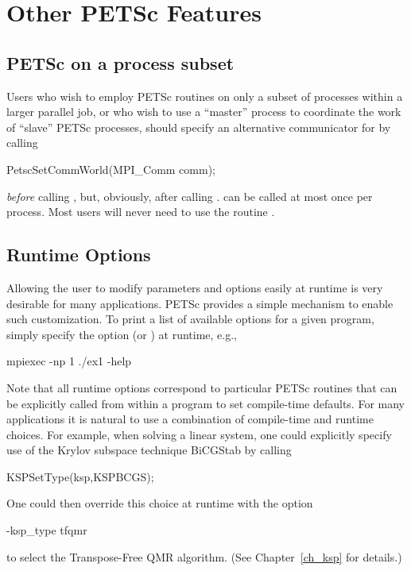 {{%
\cleardoublepage
\chapter{Other PETSc Features}

\section{PETSc on a process subset}

Users who wish to employ PETSc routines on only a subset
of processes within a larger parallel job, or who wish to use a
``master'' process to coordinate the work of ``slave'' PETSc
processes, should specify an alternative communicator for  by calling 
\begin{tabbing}
  PetscSetCommWorld(MPI\_Comm comm);
\end{tabbing}
{\em before} calling , but, obviously, after
calling .  can be called
at most once per process. Most users will never need to use the routine
.

\section{Runtime Options}  
\label{sec_options}

Allowing the user to modify parameters and options easily at runtime
is very desirable for many applications.  PETSc provides a simple
mechanism to enable such customization.  To print a list of
available options for a given program, simply specify the option 
 (or ) at runtime, e.g.,  
\begin{tabbing}
    mpiexec -np 1 ./ex1 -help
\end{tabbing}

Note that all runtime options correspond to particular PETSc routines
that can be explicitly called from within a program to set compile-time
defaults.   For many applications it is natural to use a combination
of compile-time and runtime choices.  For example, when solving a linear
system, one could explicitly specify use of the Krylov subspace
technique BiCGStab by calling
\begin{tabbing}
   KSPSetType(ksp,KSPBCGS);
\end{tabbing}
One could then override this choice at runtime with the option
\begin{tabbing}
    -ksp\_type tfqmr
\end{tabbing}
to select the Transpose-Free QMR algorithm. (See Chapter~\ref{ch_ksp} for details.)

}}

